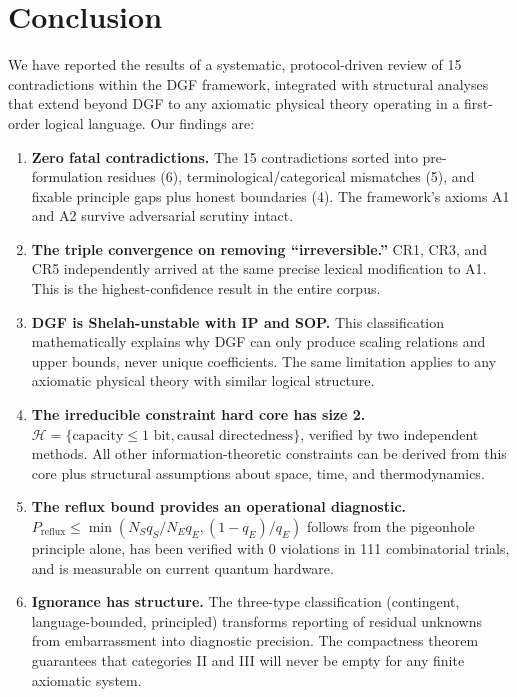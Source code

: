 \documentclass[12pt,a4paper]{article}
\theoremstyle{definition}
\theoremstyle{remark}
\begin{document}
\section{Conclusion}
\label{sec:conclusion}

We have reported the results of a systematic, protocol-driven review of 15 contradictions within the DGF framework, integrated with structural analyses that extend beyond DGF to any axiomatic physical theory operating in a first-order logical language. Our findings are:

\begin{enumerate}[leftmargin=*,itemsep=0pt,topsep=0pt]
\item \textbf{Zero fatal contradictions.} The 15 contradictions sorted into pre-formulation residues (6), terminological/categorical mismatches (5), and fixable principle gaps plus honest boundaries (4). The framework's axioms A1 and A2 survive adversarial scrutiny intact.

\item \textbf{The triple convergence on removing ``irreversible.''} CR1, CR3, and CR5 independently arrived at the same precise lexical modification to A1. This is the highest-confidence result in the entire corpus.

\item \textbf{DGF is Shelah-unstable with IP and SOP.} This classification mathematically explains why DGF can only produce scaling relations and upper bounds, never unique coefficients. The same limitation applies to any axiomatic physical theory with similar logical structure.

\item \textbf{The irreducible constraint hard core has size 2.} $\mathcal{H} = \{\text{capacity} \leq 1\text{ bit}, \text{causal directedness}\}$, verified by two independent methods. All other information-theoretic constraints can be derived from this core plus structural assumptions about space, time, and thermodynamics.

\item \textbf{The reflux bound provides an operational diagnostic.} $P_{\mathrm{reflux}} \leq \min(N_S q_S/N_E q_E, (1-q_E)/q_E)$ follows from the pigeonhole principle alone, has been verified with 0 violations in 111 combinatorial trials, and is measurable on current quantum hardware.

\item \textbf{Ignorance has structure.} The three-type classification (contingent, language-bounded, principled) transforms reporting of residual unknowns from embarrassment into diagnostic precision. The compactness theorem guarantees that categories II and III will never be empty for any finite axiomatic system.
\end{enumerate}
\end{document}
